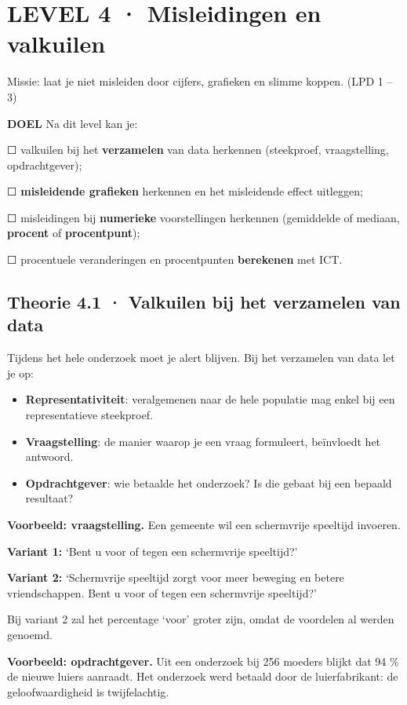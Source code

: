 \section{LEVEL 4 · Misleidingen en valkuilen}

\begin{missie}
Missie: laat je niet misleiden door cijfers, grafieken en slimme koppen. (LPD 1 – 3)
\end{missie}

\begin{doel}
\textbf{DOEL} \quad Na dit level kan je:

☐ valkuilen bij het \textbf{verzamelen} van data herkennen (steekproef, vraagstelling, opdrachtgever);

☐ \textbf{misleidende grafieken} herkennen en het misleidende effect uitleggen;

☐ misleidingen bij \textbf{numerieke} voorstellingen herkennen (gemiddelde of mediaan, \textbf{procent} of \textbf{procentpunt});

☐ procentuele veranderingen en procentpunten \textbf{berekenen} met ICT.
\end{doel}

\subsection*{Theorie 4.1 · Valkuilen bij het verzamelen van data}

\begin{theorie}
Tijdens het hele onderzoek moet je alert blijven. Bij het verzamelen van data let je op:

\begin{itemize}
\item \textbf{Representativiteit}: veralgemenen naar de hele populatie mag enkel bij een representatieve steekproef.
\item \textbf{Vraagstelling}: de manier waarop je een vraag formuleert, beïnvloedt het antwoord.
\item \textbf{Opdrachtgever}: wie betaalde het onderzoek? Is die gebaat bij een bepaald resultaat?
\end{itemize}
\end{theorie}

\begin{voorbeeld}
\textbf{Voorbeeld: vraagstelling.} Een gemeente wil een schermvrije speeltijd invoeren.

\textbf{Variant 1:} ‘Bent u voor of tegen een schermvrije speeltijd?’

\textbf{Variant 2:} ‘Schermvrije speeltijd zorgt voor meer beweging en betere vriendschappen. Bent u voor of tegen een schermvrije speeltijd?’

Bij variant 2 zal het percentage ‘voor’ groter zijn, omdat de voordelen al werden genoemd.

\textbf{Voorbeeld: opdrachtgever.} Uit een onderzoek bij 256 moeders blijkt dat 94 \% de nieuwe luiers aanraadt. Het onderzoek werd betaald door de luierfabrikant: de geloofwaardigheid is twijfelachtig.
\end{voorbeeld}

